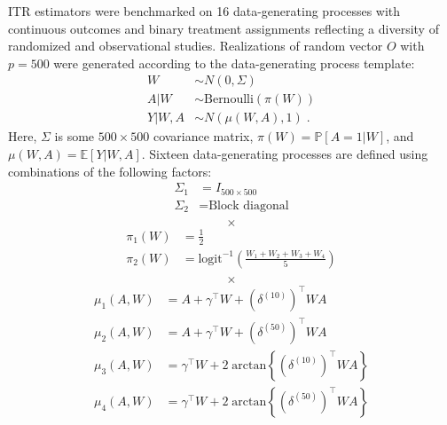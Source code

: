 \documentclass[25pt, a1paper, landscape, innermargin=-3in]{tikzposter}
\begin{document}
\begin{columns}
{    ITR estimators were benchmarked on 16 data-generating processes with
    continuous outcomes and binary treatment assignments reflecting a diversity
    of randomized and observational studies. Realizations of random vector $O$
    with $p=500$ were generated according to the data-generating process
    template:
    \begin{align*}
      W & \sim N(0, \Sigma) \\
      A|W & \sim \text{Bernoulli}(\pi(W)) \\
      Y|W, A & \sim N(\mu(W, A), 1) \;.
    \end{align*}
    Here, $\Sigma$ is some $500 \times 500$ covariance matrix,
    $\pi(W)=\mathbb{P}[A=1|W]$, and $\mu(W,A) = \mathbb{E}[Y|W, A]$. Sixteen
    data-generating processes are defined using combinations of the following
    factors:
    \begin{equation*}
      \begin{split}
        \Sigma_{1} & = I_{500 \times 500} \\
        \Sigma_{2} & = \text{Block diagonal} \\
      \end{split}
    \end{equation*}
    \begin{equation*}
      \times
    \end{equation*}
    \begin{equation*}
      \begin{split}
        \pi_{1}(W) & = \frac{1}{2} \\
        \pi_{2}(W) & = \text{logit}^{-1}\left(\frac{W_{1} + W_{2} + W_{3} + W_{4}}{5}\right) \\
      \end{split}
    \end{equation*}
    \begin{equation*}
      \times
    \end{equation*}
    \begin{equation*}
      \begin{split}
        \mu_{1}(A, W) & = A + \gamma^{\top}W + (\delta^{(10)})^{\top}WA \\
        \mu_{2}(A, W) & = A + \gamma^{\top}W + (\delta^{(50)})^{\top}WA \\
        \mu_{3}(A, W) & = \gamma^{\top}W + 2\;\text{arctan}\left\{(\delta^{(10)})^{\top}WA\right\} \\
        \mu_{4}(A, W) & = \gamma^{\top}W + 2\;\text{arctan}\left\{(\delta^{(50)})^{\top}WA\right\} \\
      \end{split}
    \end{equation*}

}
\end{columns}
\end{document}
